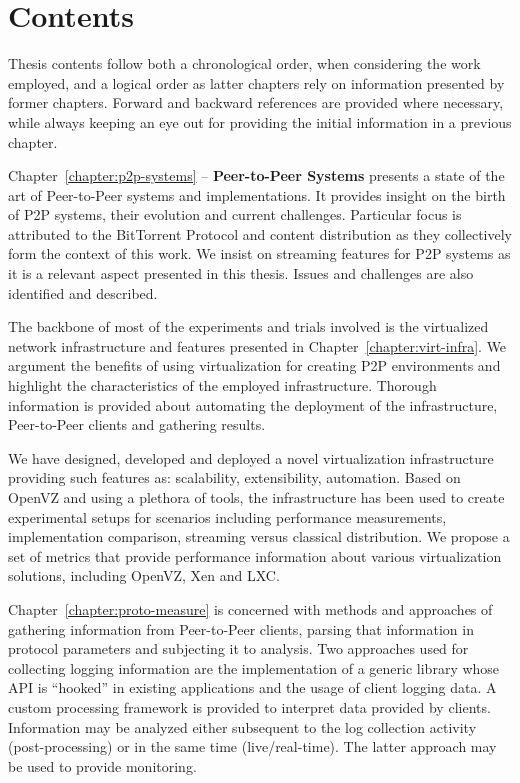 \section{Contents}
\label{sec:intro:contents}

Thesis contents follow both a chronological order, when considering the work
employed, and a logical order as latter chapters rely on information presented
by former chapters. Forward and backward references are provided where
necessary, while always keeping an eye out for providing the initial
information in a previous chapter.

Chapter~\ref{chapter:p2p-systems} -- \textbf{Peer-to-Peer Systems} presents a
state of the art of Peer-to-Peer systems and implementations. It provides
insight on the birth of P2P systems, their evolution and current challenges.
Particular focus is attributed to the BitTorrent Protocol and content
distribution as they collectively form the context of this work. We insist on
streaming features for P2P systems as it is a relevant aspect presented in
this thesis. Issues and challenges are also identified and described.

The backbone of most of the experiments and trials involved is the
virtualized network infrastructure and features presented in
Chapter~\ref{chapter:virt-infra}. We argument the benefits of using
virtualization for creating P2P environments and highlight the characteristics
of the employed infrastructure. Thorough information is provided about
automating the deployment of the infrastructure, Peer-to-Peer clients and
gathering results.

We have designed, developed and deployed a novel virtualization infrastructure
providing such features as: scalability, extensibility, automation. Based on
OpenVZ and using a plethora of tools, the infrastructure has been used to
create experimental setups for scenarios including performance measurements,
implementation comparison, streaming versus classical distribution. We propose
a set of metrics that provide performance information about various
virtualization solutions, including OpenVZ, Xen and LXC.

Chapter~\ref{chapter:proto-measure} is concerned with methods and approaches
of gathering information from Peer-to-Peer clients, parsing that information
in protocol parameters and subjecting it to analysis. Two approaches used for
collecting logging information are the implementation of a generic library
whose API is ``hooked'' in existing applications and the usage of client
logging data. A custom processing framework is provided to interpret data
provided by clients. Information may be analyzed either subsequent to the log
collection activity (post-processing) or in the same time (live/real-time).
The latter approach may be used to provide monitoring.

